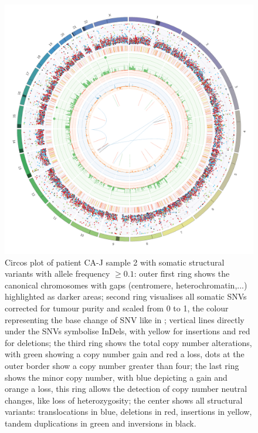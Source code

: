 \begin{figure}[htp]
\centering
\includegraphics[width=.99\linewidth]{Figures/CASCADE/CA80/CA80-2.circos.png}
\caption[Circos plot of patient CA-J sample 2]{Circos plot of patient CA-J sample 2 with somatic structural variants with allele frequency $\geq 0.1$: outer first ring shows the canonical chromosomes with gaps (centromere, heterochromatin,...) highlighted as darker areas; second ring visualises all somatic SNVs corrected for tumour purity and scaled from 0 to 1, the colour representing the base change of SNV like in \protect\textcite{Alexandrov2013}; vertical lines directly under the SNVs symbolise InDels, with yellow for insertions and red for deletions; the third ring shows the total copy number alterations, with green showing a copy number gain and red a loss, dots at the outer border show a copy number greater than four; the last ring shows the minor copy number, with blue depicting a gain and orange a loss, this ring allows the detection of copy number neutral changes, like loss of heterozygosity; the center shows all structural variants: translocations in blue, deletions in red, insertions in yellow, tandem duplications in green and inversions in black.} \label{fig:ca80.2circos}
\end{figure}

